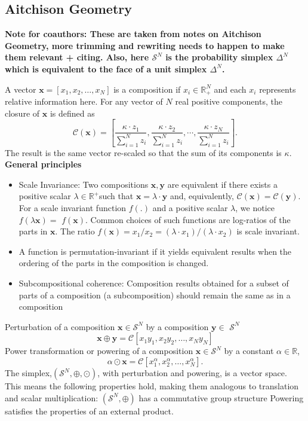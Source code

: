 \begin{appendices}
\section{Aitchison Geometry}
\textbf{Note for coauthors: These are taken from notes on Aitchison Geometry, more trimming and rewriting needs to happen to make them relevant + citing. Also, here $\mathcal{S}^N$ is the probability simplex $\Delta^{N}$ which is equivalent to the face of a unit simplex $\Delta^{N}$.\\}

A vector $\mathbf{x}=\left[x_1, x_2, \ldots, x_N\right]$ is a composition if $x_i \in \mathbb{R}_{+}^N$ and each $x_i$ represents relative information here. For any vector of $N$ real positive components, the closure of $\mathbf{x}$ is defined as
$$
\mathcal{C}(\mathbf{x})=\left[\frac{\kappa \cdot z_1}{\sum_{i=1}^N z_i}, \frac{\kappa \cdot z_2}{\sum_{i=1}^N z_i}, \cdots, \frac{\kappa \cdot z_N}{\sum_{i=1}^N z_i}\right] .
$$
The result is the same vector re-scaled so that the sum of its components is $\kappa$.\\


\textbf{General principles}

\begin{itemize}
	\item Scale Invariance: Two compositions $\mathbf{x}, \mathbf{y}$ are equivalent if there exists a positive scalar $\lambda \in \mathbb{R}^{+}$such that $\mathbf{x}=\lambda \cdot \mathbf{y}$ and, equivalently, $\mathcal{C}(\mathbf{x})=\mathcal{C}(\mathbf{y})$. For a scale invariant function $f(.)$ and a positive scalar $\lambda$, we notice $f(\lambda \mathbf{x})=$ $f(\mathbf{x})$.  Common choices of such functions are log-ratios of the parts in $\mathbf{x}$. The ratio $f(\mathbf{x})=x_1 / x_2=\left(\lambda \cdot x_1\right) /\left(\lambda \cdot x_2\right)$ is scale invariant.
	\item A function is permutation-invariant if it yields equivalent results when the ordering of the parts in the composition is changed. 
	\item Subcompositional coherence: Composition results obtained for a subset of parts of a composition (a subcomposition) should remain the same as in a composition

\end{itemize}
Perturbation of a composition $\mathbf{x} \in \mathcal{S}^N$ by a composition $\mathbf{y} \in$ $\mathcal{S}^N$
$$
\mathbf{x} \oplus \mathbf{y}=\mathcal{C}\left[x_1 y_1, x_2 y_2, \ldots, x_N y_N\right]
$$
Power transformation or powering of a composition $\mathbf{x} \in \mathcal{S}^N$ by a constant $\alpha \in \mathbb{R}$,
$$
\alpha \odot \mathbf{x}=\mathcal{C}\left[x_1^\alpha, x_2^\alpha, \ldots, x_N^\alpha\right] .
$$
The simplex,$\left(\mathcal{S}^N, \oplus, \odot\right)$, with perturbation and powering, is a vector space. This means the following properties hold, making them analogous to translation and scalar multiplication:
$\left(\mathcal{S}^N, \oplus\right)$ has a commutative group structure
Powering satisfies the properties of an external product.


\end{appendices}
